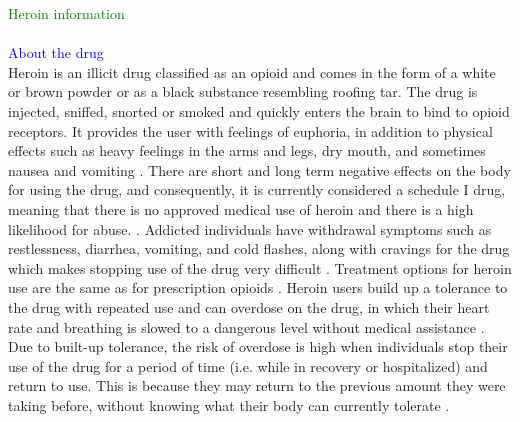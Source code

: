 \documentclass[12pt]{article}
\begin{document}
\textcolor{green}{Heroin information} \\ \\
\textcolor{blue}{About the drug} \\
Heroin is an illicit drug classified as an opioid and comes in the form of a white or brown powder or as a black substance resembling roofing tar. The drug is injected, sniffed, snorted or smoked and quickly enters the brain to bind to opioid receptors. It provides the user with feelings of euphoria, in addition to physical effects such as heavy feelings in the arms and legs, dry mouth, and sometimes nausea and vomiting \cite{NIH1, NIDA2}. There are short and long term negative effects on the body for using the drug, and consequently, it is currently considered a schedule I drug, meaning that there is no approved medical use of heroin and there is a high likelihood for abuse. \cite{DEA1, NIH1}. Addicted individuals have withdrawal symptoms such as restlessness, diarrhea, vomiting, and cold flashes, along with cravings for the drug which makes stopping use of the drug very difficult \cite{NIH1}. Treatment options for heroin use are the same as for prescription opioids \cite{SAMSHA1, NIH1}. Heroin users build up a tolerance to the drug with repeated use and can overdose on the drug, in which their heart rate and breathing is slowed to a dangerous level without medical assistance \cite{NIDA2, NIH1}. Due to built-up tolerance, the risk of overdose is high when individuals stop their use of the drug for a period of time (i.e. while in recovery or hospitalized) and return to use. This is because they may return to the previous amount they were taking before, without knowing what their body can currently tolerate \cite{NIH2}.  
\end{document}
